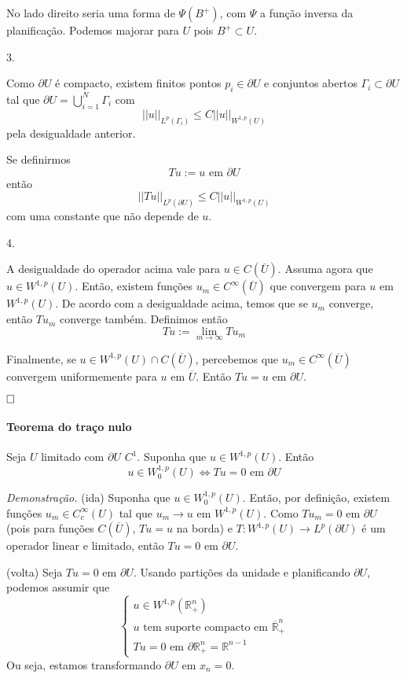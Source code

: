 \documentclass[a4paper, 11pt]{article}
\newcommand{\qed}{$\hfill\square$}
\newcommand{\R}{\mathbb{R}}
\newcommand{\p}{\partial}
\newcommand{\pu}{\partial U}
\begin{document}
No lado direito seria uma forma de $\Psi(B^+)$, com $\Psi$ a função inversa da planificação. Podemos majorar para $U$ pois $B^+ \subset U$.

3.

Como $\pu$ é compacto, existem finitos pontos $p_i \in \pu$ e conjuntos abertos $\Gamma_i \subset \pu$ tal que $\pu = \bigcup_{i=1}^N \Gamma_i$ com \[ ||u||_{L^p(\Gamma_i)} \leq C ||u||_{W^{1,p}(U)} \] pela desigualdade anterior.

Se definirmos \[ Tu := u \text{ em } \pu \] então \[ ||Tu||_{L^p(\pu)} \leq C ||u||_{W^{1,p}(U)} \] com uma constante que não depende de $u$.


4.

A desigualdade do operador acima vale para $u \in C(\overline{U})$. Assuma agora que $u \in W^{1,p}(U)$. Então, existem funções $u_m \in C^\infty (\overline{U})$ que convergem para $u$ em $W^{1,p}(U)$. De acordo com a desigualdade acima, temos que se $u_m$ converge, então $Tu_m$ converge também. Definimos então \[ Tu := \lim_{m\rightarrow \infty} Tu_m \] 

Finalmente, se $u \in W^{1,p}(U) \cap C(\overline{U})$, percebemos que $u_m \in C^\infty(\overline{U})$ convergem uniformemente para $u$ em $\overline{U}$. Então $Tu=u$ em $\pu$.

\qed






\paragraph{Teorema do traço nulo} Seja $U$ limitado com $\pu$ $C^1$. Suponha que $u \in W^{1,p}(U)$. Então \[ u \in W^{1,p}_0(U) \Leftrightarrow Tu =0 \text{ em } \pu \]

\textit{Demonstração.} (ida) Suponha que $ u \in W^{1,p}_0(U) $. Então, por definição, existem funções $ u_m \in C^\infty_c(U) $ tal que $ u_m\rightarrow u $ em $ W^{1,p}(U) $. Como $ Tu_m=0 $ em $ \pu $ (pois para funções $ C(\overline{U}) $, $ Tu=u $ na borda) e $ T:W^{1,p}(U)\rightarrow L^p(\pu) $ é um operador linear e limitado, então $ Tu=0 $ em $ \pu $.

(volta) Seja $ Tu=0 \text{ em } \pu $. Usando partições da unidade e planificando $ \pu $, podemos assumir que \[ \begin{cases}
	u \in W^{1,p}(\R^n_+) \\
	u \text{ tem suporte compacto em } \overline{\R}^n_+\\
	Tu=0 \text{ em } \p\R^n_+ = \R^{n-1}
\end{cases} \] Ou seja, estamos transformando $ \pu $ em $ {x_n=0} $.
\end{document}

